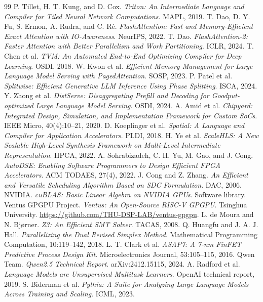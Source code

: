 \documentclass[11pt]{article}
\begin{document}
\begin{thebibliography}{99}
 P. Tillet, H. T. Kung, and D. Cox. \emph{Triton: An Intermediate Language and Compiler for Tiled Neural Network Computations}. MAPL, 2019.
 T. Dao, D. Y. Fu, S. Ermon, A. Rudra, and C. Ré. \emph{FlashAttention: Fast and Memory-Efficient Exact Attention with IO-Awareness}. NeurIPS, 2022.
 T. Dao. \emph{FlashAttention-2: Faster Attention with Better Parallelism and Work Partitioning}. ICLR, 2024.
 T. Chen et al. \emph{TVM: An Automated End-to-End Optimizing Compiler for Deep Learning}. OSDI, 2018.
 W. Kwon et al. \emph{Efficient Memory Management for Large Language Model Serving with PagedAttention}. SOSP, 2023.
 P. Patel et al. \emph{Splitwise: Efficient Generative LLM Inference Using Phase Splitting}. ISCA, 2024.
 Y. Zhong et al. \emph{DistServe: Disaggregating Prefill and Decoding for Goodput-optimized Large Language Model Serving}. OSDI, 2024.
 A. Amid et al. \emph{Chipyard: Integrated Design, Simulation, and Implementation Framework for Custom SoCs}. IEEE Micro, 40(4):10--21, 2020.
 D. Koeplinger et al. \emph{Spatial: A Language and Compiler for Application Accelerators}. PLDI, 2018.
 H. Ye et al. \emph{ScaleHLS: A New Scalable High-Level Synthesis Framework on Multi-Level Intermediate Representation}. HPCA, 2022.
 A. Sohrabizadeh, C. H. Yu, M. Gao, and J. Cong. \emph{AutoDSE: Enabling Software Programmers to Design Efficient FPGA Accelerators}. ACM TODAES, 27(4), 2022.
 J. Cong and Z. Zhang. \emph{An Efficient and Versatile Scheduling Algorithm Based on SDC Formulation}. DAC, 2006.
 NVIDIA. \emph{cuBLAS: Basic Linear Algebra on NVIDIA GPUs}. Software library.
 Ventus GPGPU Project. \emph{Ventus: An Open-Source RISC-V GPGPU}. Tsinghua University. \url{https://github.com/THU-DSP-LAB/ventus-gpgpu}.
 L. de Moura and N. Bjørner. \emph{Z3: An Efficient SMT Solver}. TACAS, 2008.
 Q. Huangfu and J. A. J. Hall. \emph{Parallelizing the Dual Revised Simplex Method}. Mathematical Programming Computation, 10:119--142, 2018.
 L. T. Clark et al. \emph{ASAP7: A 7-nm FinFET Predictive Process Design Kit}. Microelectronics Journal, 53:105--115, 2016.
 Qwen Team. \emph{Qwen2.5 Technical Report}. arXiv:2412.15115, 2024.
 A. Radford et al. \emph{Language Models are Unsupervised Multitask Learners}. OpenAI technical report, 2019.
 S. Biderman et al. \emph{Pythia: A Suite for Analyzing Large Language Models Across Training and Scaling}. ICML, 2023.

\end{thebibliography}
\end{document}
